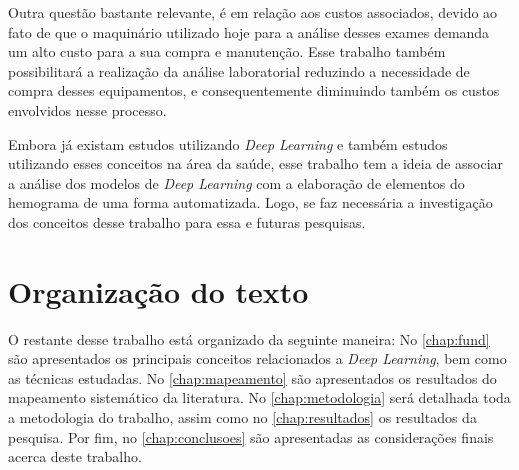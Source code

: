 Outra questão bastante relevante, é em relação aos custos associados, devido ao fato de que o maquinário utilizado hoje para a análise desses exames demanda um alto custo para a sua compra e manutenção. Esse trabalho também possibilitará a realização da análise laboratorial reduzindo a necessidade de compra desses equipamentos, e consequentemente diminuindo também os custos envolvidos nesse processo.

Embora já existam estudos utilizando \emph{Deep Learning} e também estudos utilizando esses conceitos na área da saúde, esse trabalho tem a ideia de associar a análise dos modelos de \emph{Deep Learning} com a elaboração de elementos do hemograma de uma forma automatizada. Logo, se faz necessária a investigação dos conceitos desse trabalho para essa e futuras pesquisas.

\section{Organização do texto}
\label{sec:organizacao}
O restante desse trabalho está organizado da seguinte maneira: No \autoref{chap:fund} são apresentados os principais conceitos relacionados a \emph{Deep Learning}, bem como as técnicas estudadas. No \autoref{chap:mapeamento} são apresentados os resultados do mapeamento sistemático da literatura. No \autoref{chap:metodologia} será detalhada toda a metodologia do trabalho, assim como no \autoref{chap:resultados} os resultados da pesquisa. Por fim, no \autoref{chap:conclusoes} são apresentadas as considerações finais acerca deste trabalho.